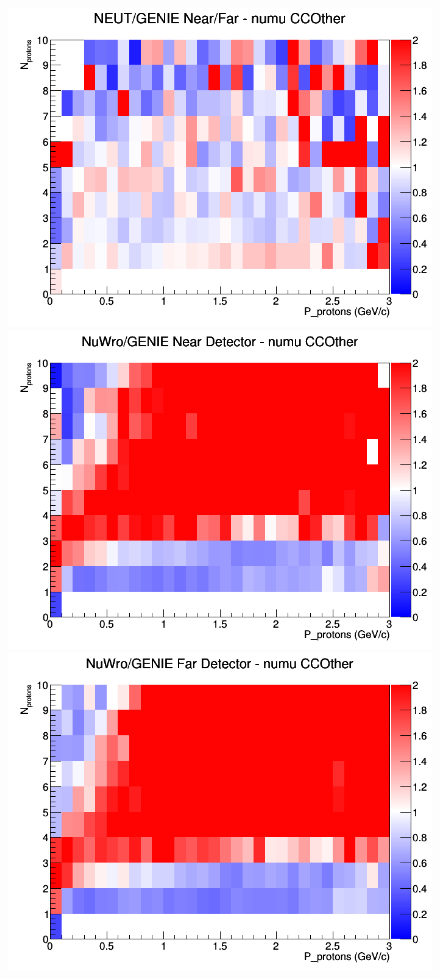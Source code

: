 \begin{figure}[h]
\endminipage
{}
\includegraphics[width=\linewidth]{N_P/nominal/protons/ratios/CCOther_NEUT_GENIE_numu_NF_N_P.png}
\endminipage
\newline
{}
\includegraphics[width=\linewidth]{N_P/nominal/protons/ratios/CCOther_NuWro_GENIE_numu_near_N_P.png}
\endminipage
{}
\includegraphics[width=\linewidth]{N_P/nominal/protons/ratios/CCOther_NuWro_GENIE_numu_far_N_P.png}

\end{figure}
